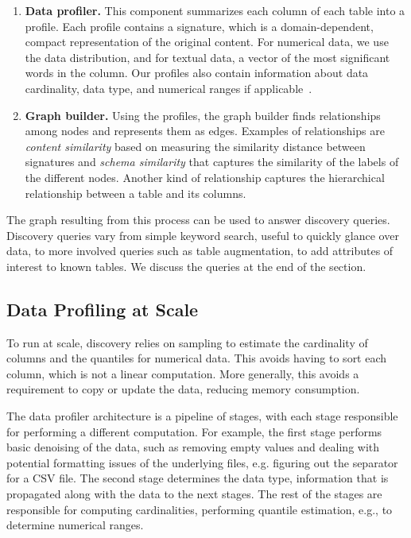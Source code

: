 \begin{enumerate}
\item {\bf Data profiler.} This component summarizes each column of each table
into a profile. Each profile contains a signature, which is a domain-dependent,
compact representation of the original content.  For numerical data, we use the
data distribution, and for textual data,  a vector of the most significant words
in the column.  Our profiles also contain information about data cardinality,
data type, and numerical ranges if applicable~\cite{profiling_survey}.

\item {\bf Graph builder.} Using the profiles, the graph builder finds
relationships among nodes and represents them as edges. Examples of
relationships are \emph{content similarity} based on measuring the similarity
distance between signatures and \emph{schema similarity} that captures the
similarity of the labels of the different nodes. Another kind of relationship
captures the hierarchical relationship between a table and its columns.

\end{enumerate}

The graph resulting from this process can be used to answer discovery queries.
Discovery queries vary from simple keyword search, useful to quickly glance over
data, to more involved queries such as table augmentation, to add attributes of
interest to known tables. We discuss the queries at the end of the section. 

\subsection{Data Profiling at Scale}

To run at scale, discovery relies on sampling to estimate the cardinality of
columns and the quantiles for numerical data. This avoids having to sort each
column, which is not a linear computation.  More generally, this avoids a
requirement to copy or update the data, reducing memory consumption.

The data profiler architecture is a pipeline of stages, with each stage
responsible for performing a different computation. For example, the first stage
performs basic denoising of the data, such as removing empty values and dealing
with potential formatting issues of the underlying files, e.g. figuring out the
separator for a CSV file.  The second stage determines the data type,
information that is propagated along with the data to the next stages. The rest
of the stages are responsible for computing cardinalities, performing quantile
estimation, e.g., to determine numerical ranges.


